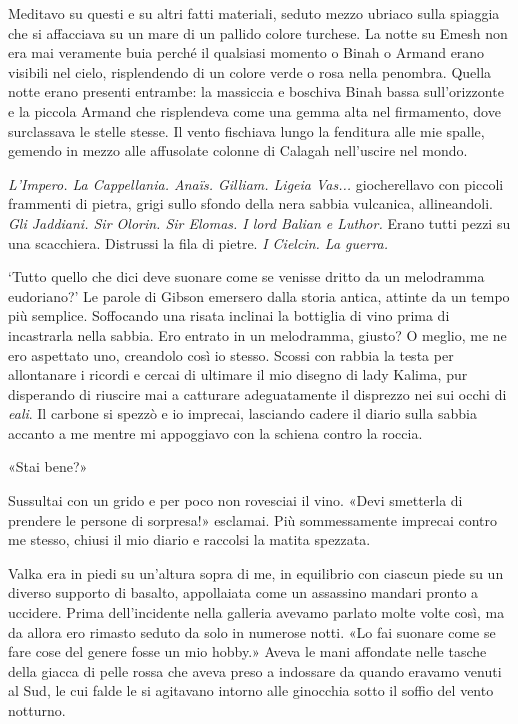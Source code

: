 \begin{figure}
	\centering
	\def\svgwidth{\columnwidth}
	\scalebox{0.2}{}
\end{figure}

Meditavo su questi e su altri fatti materiali, seduto mezzo ubriaco
sulla spiaggia che si affacciava su un mare di un pallido colore
turchese. La notte su Emesh non era mai veramente buia perché il
qualsiasi momento o Binah o Armand erano visibili nel cielo,
risplendendo di un colore verde o rosa nella penombra. Quella notte
erano presenti entrambe: la massiccia e boschiva Binah bassa
sull'orizzonte e la piccola Armand che risplendeva come una gemma alta
nel firmamento, dove surclassava le stelle stesse. Il vento fischiava
lungo la fenditura alle mie spalle, gemendo in mezzo alle affusolate
colonne di Calagah nell'uscire nel mondo.

\emph{L'Impero. La Cappellania. Anaïs. Gilliam. Ligeia Vas...}
giocherellavo con piccoli frammenti di pietra, grigi sullo sfondo della
nera sabbia vulcanica, allineandoli. \emph{Gli Jaddiani. Sir Olorin. Sir
	Elomas. I lord Balian e Luthor.} Erano tutti pezzi su una scacchiera.
Distrussi la fila di pietre. \emph{I Cielcin. La guerra.}

`Tutto quello che dici deve suonare come se venisse dritto da un
melodramma eudoriano?' Le parole di Gibson emersero dalla storia antica,
attinte da un tempo più semplice. Soffocando una risata inclinai la
bottiglia di vino prima di incastrarla nella sabbia. Ero entrato in un
melodramma, giusto? O meglio, me ne ero aspettato uno, creandolo così io
stesso. Scossi con rabbia la testa per allontanare i ricordi e cercai di
ultimare il mio disegno di lady Kalima, pur disperando di riuscire mai a
catturare adeguatamente il disprezzo nei sui occhi di \emph{eali}. Il
carbone si spezzò e io imprecai, lasciando cadere il diario sulla sabbia
accanto a me mentre mi appoggiavo con la schiena contro la roccia.

«Stai bene?»

Sussultai con un grido e per poco non rovesciai il vino. «Devi smetterla
di prendere le persone di sorpresa!» esclamai. Più sommessamente
imprecai contro me stesso, chiusi il mio diario e raccolsi la matita
spezzata.

Valka era in piedi su un'altura sopra di me, in equilibrio con ciascun
piede su un diverso supporto di basalto, appollaiata come un assassino
mandari pronto a uccidere. Prima dell'incidente nella galleria avevamo
parlato molte volte così, ma da allora ero rimasto seduto da solo in
numerose notti. «Lo fai suonare come se fare cose del genere fosse un
mio hobby.» Aveva le mani affondate nelle tasche della giacca di pelle
rossa che aveva preso a indossare da quando eravamo venuti al Sud, le
cui falde le si agitavano intorno alle ginocchia sotto il soffio del
vento notturno.

